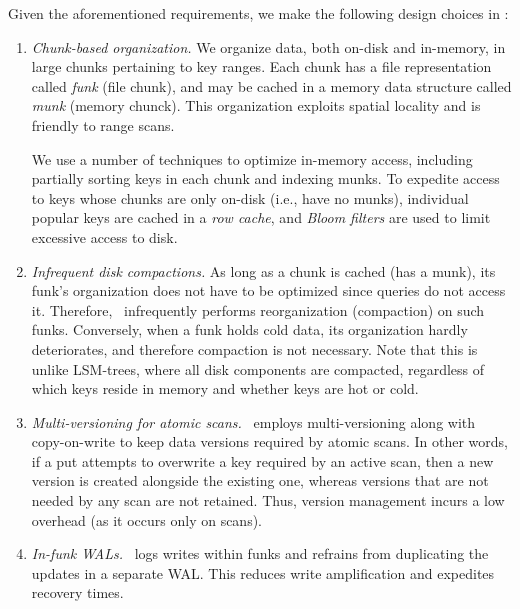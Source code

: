 
Given the aforementioned requirements, we make the following design choices in \sys:

\begin{enumerate}\itemsep0pt
\item \emph{Chunk-based organization.}
We organize data, both on-disk and in-memory,  in large chunks pertaining to  key ranges.  
Each chunk has a file representation called  \emph{funk} (file chunk), and may be cached in a  memory data structure called \emph{munk} (memory chunck).
This organization exploits spatial locality and is friendly to range scans.

We use a number of techniques to optimize in-memory  access, including partially sorting keys in each chunk and 
indexing munks. 
To expedite access to  keys whose chunks are only on-disk  (i.e., have no munks), 
individual popular keys are cached in a \emph{row cache}, 
and \emph{Bloom filters} are used to limit excessive access to disk. 

\item \emph{Infrequent disk compactions.}
As long as a chunk is cached (has a munk), its funk's organization does not have to be optimized since 
queries do not access it. Therefore, \sys\ infrequently performs reorganization (compaction) on such funks.
Conversely, when a funk holds cold data, its organization hardly deteriorates, and therefore compaction is not necessary.
Note that this is unlike LSM-trees, where all disk components are compacted, regardless of which keys reside in memory and whether 
keys are hot or cold. 

\item \emph{Multi-versioning for atomic scans.}
\sys\ employs multi-versioning along with
copy-on-write to keep data versions required by atomic scans. 
In other words, if a put attempts to overwrite a key  required by an active scan, then a new version is created alongside the 
existing one, whereas versions that are not needed by any scan are not retained. 
Thus, version management incurs a low overhead (as it occurs only on scans). 

\item \emph{In-funk WALs.}
\sys\ logs writes within funks and refrains from duplicating the updates  in a separate WAL. This reduces write amplification and expedites recovery times. 
\end{enumerate}
